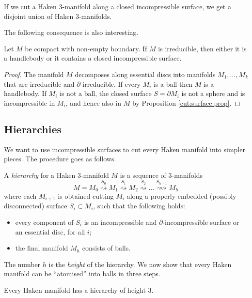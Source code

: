 \begin{cor} \label{Haken:cor}
If we cut a Haken 3-manifold along a closed incompressible surface, we get a disjoint union of Haken 3-manifolds.
\end{cor}

The following consequence is also interesting.

\begin{cor} \label{handlebody:closed:cor}
Let $M$ be compact with non-empty boundary. If $M$ is irreducible, then either it is a handlebody or it contains a closed incompressible surface. 
\end{cor}
\begin{proof}
The manifold $M$ decomposes along essential discs into manifolds $M_1, \ldots, M_k$ that are irreducible and $\partial$-irreducible. If every $M_i$ is a ball then $M$ is a handlebody. If $M_i$ is not a ball, the closed surface $S=\partial M_i$ is not a sphere and is incompressible in $M_i$, and hence also in $M$ by Proposition \ref{cut:surface:prop}.
\end{proof}

\subsection{Hierarchies}
We want to use incompressible surfaces to cut every Haken manifold into simpler pieces. The procedure goes as follows.

A \emph{hierarchy} for a Haken 3-manifold $M$ is a sequence of 3-manifolds
$$M=M_0 \stackrel{S_0}\rightsquigarrow M_1 \stackrel{S_1}\rightsquigarrow M_2 \stackrel{S_2}\rightsquigarrow \ldots \stackrel{S_{h-1}}\rightsquigarrow M_h $$
where each $M_{i+1}$ is obtained cutting $M_i$ along a properly embedded (possibly disconnected) surface $S_i\subset M_i$, such that the following holds:
\begin{itemize}
\item every component of $S_i$ is an incompressible and $\partial$-incompressible surface or an essential disc, for all $i$;
\item the final manifold $M_h$ consists of balls.
\end{itemize}
The number $h$ is the \emph{height} of the hierarchy. We now show that every Haken manifold can be ``atomised'' into balls in three steps.
\begin{teo} \label{hierarchy:teo}
Every Haken manifold has a hierarchy of height $3$.
\end{teo}

